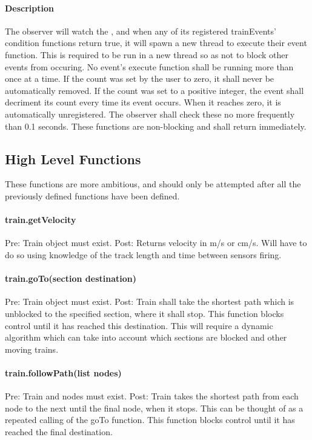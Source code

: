 \documentclass[a4paper,11pt,notitlepage]{article}
\begin{document}
\paragraph{Description}
The observer will watch the \LC, and when any of its registered trainEvents' condition functions return true, it will spawn a new thread to execute their event function. This is required to be run in a new thread so as not to block other events from occuring. No event's execute function shall be running more than once at a time. If the count was set by the user to zero, it shall never be automatically removed. If the count was set to a positive integer, the event shall decriment its count every time its event occurs. When it reaches zero, it is automatically unregistered. The observer shall check these no more frequently than 0.1 seconds.
These functions are non-blocking and shall return immediately.

\subsection{High Level Functions}
These functions are more ambitious, and should only be attempted after all the previously defined functions have been defined.
\paragraph{train.getVelocity} Pre: Train object must exist. Post: Returns velocity in m/s or cm/s. Will have to do so using knowledge of the track length and time between sensors firing.
\paragraph{train.goTo(section destination)} Pre: Train object must exist. Post: Train shall take the shortest path which is unblocked to the specified section, where it shall stop. This function blocks control until it has reached this destination. This will require a dynamic algorithm which can take into account which sections are blocked and other moving trains.
\paragraph{train.followPath(list nodes)} Pre: Train and nodes must exist. Post: Train takes the shortest path from each node to the next until the final node, when it stops. This can be thought of as a repeated calling of the goTo function. This function blocks control until it has reached the final destination.
\end{document}

